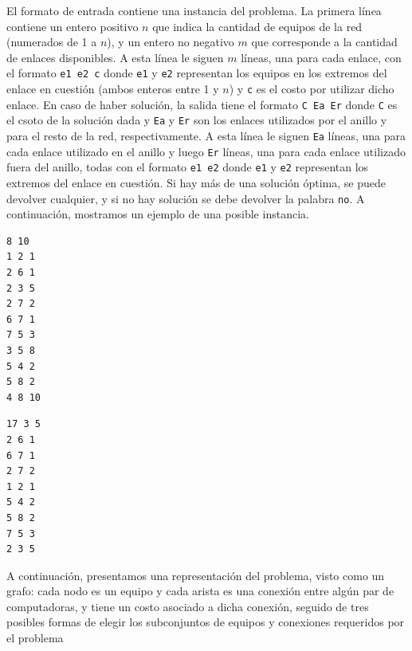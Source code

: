 \documentclass[11pt, a4paper, twoside]{article}
\begin{document}
El formato de entrada contiene una instancia del problema. La primera línea 
contiene un entero positivo $n$ que indica la cantidad de equipos de la red
(numerados de 1 a $n$), y un entero no negativo $m$ que corresponde a la 
cantidad de enlaces disponibles. A esta línea le siguen $m$ líneas, una para
cada enlace, con el formato \texttt{e1 e2 c} donde \texttt{e1} y \texttt{e2}
representan los equipos en los extremos del enlace en cuestión (ambos enteros
entre 1 y $n$) y \texttt{c} es el costo por utilizar dicho enlace. En caso de
haber solución, la salida tiene el formato \texttt{C Ea Er} donde \texttt{C} es
el csoto de la solución dada y \texttt{Ea} y \texttt{Er} son los enlaces 
utilizados por el anillo y para el resto de la red, respectivamente. A esta línea
le siguen \texttt{Ea} líneas, una para cada enlace utilizado en el anillo y luego
\texttt{Er} líneas, una para cada enlace utilizado fuera del anillo, todas con el 
formato \texttt{e1 e2} donde \texttt{e1} y \texttt{e2} representan los extremos
del enlace en cuestión. Si hay más de una solución óptima, se puede devolver 
cualquier, y si no hay solución se debe devolver la palabra \texttt{no}. A 
continuación, mostramos un ejemplo de una posible instancia.

\begin{minipage}[t]{0.4\textwidth}
\begin{Verbatim}[frame=single,framesep=1cm,label= Ejemplo de entrada: instancia 1]
8 10
1 2 1
2 6 1
2 3 5
2 7 2
6 7 1
7 5 3
3 5 8
5 4 2
5 8 2
4 8 10
\end{Verbatim}
\end{minipage}
\hfill
\begin{minipage}[t]{0.4\textwidth}
\begin{Verbatim}[frame=single,framesep=1cm,label= Ejemplo de salida: instancia 1]
17 3 5
2 6 1
6 7 1
2 7 2
1 2 1
5 4 2
5 8 2
7 5 3
2 3 5
\end{Verbatim}
\end{minipage}

A continuación, presentamos una representación del problema, visto como 
un grafo: cada nodo es un equipo y cada arista es una conexión entre 
algún par de computadoras, y tiene un costo asociado a dicha conexión, 
seguido de tres posibles formas de elegir los subconjuntos de equipos y 
conexiones requeridos por el problema
\end{document}
